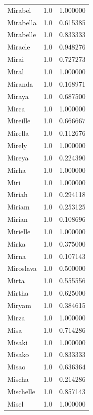 \documentclass[
  letterpaper,
  DIV=11,
  numbers=noendperiod]{scrreprt}
\begin{document}
\begin{tabular}{lrr}
Mirabel         &   1.0 &   1.000000 \\
Mirabella       &   1.0 &   0.615385 \\
Mirabelle       &   1.0 &   0.833333 \\
Miracle         &   1.0 &   0.948276 \\
Mirai           &   1.0 &   0.727273 \\
Miral           &   1.0 &   1.000000 \\
Miranda         &   1.0 &   0.168971 \\
Miraya          &   1.0 &   0.687500 \\
Mirca           &   1.0 &   1.000000 \\
Mireille        &   1.0 &   0.666667 \\
Mirella         &   1.0 &   0.112676 \\
Mirely          &   1.0 &   1.000000 \\
Mireya          &   1.0 &   0.224390 \\
Mirha           &   1.0 &   1.000000 \\
Miri            &   1.0 &   1.000000 \\
Miriah          &   1.0 &   0.294118 \\
Miriam          &   1.0 &   0.253125 \\
Mirian          &   1.0 &   0.108696 \\
Mirielle        &   1.0 &   1.000000 \\
Mirka           &   1.0 &   0.375000 \\
Mirna           &   1.0 &   0.107143 \\
Miroslava       &   1.0 &   0.500000 \\
Mirta           &   1.0 &   0.555556 \\
Mirtha          &   1.0 &   0.625000 \\
Miryam          &   1.0 &   0.384615 \\
Mirza           &   1.0 &   1.000000 \\
Misa            &   1.0 &   0.714286 \\
Misaki          &   1.0 &   1.000000 \\
Misako          &   1.0 &   0.833333 \\
Misao           &   1.0 &   0.636364 \\
Mischa          &   1.0 &   0.214286 \\
Mischelle       &   1.0 &   0.857143 \\
Misel           &   1.0 &   1.000000 \\

\end{tabular}
\end{document}
